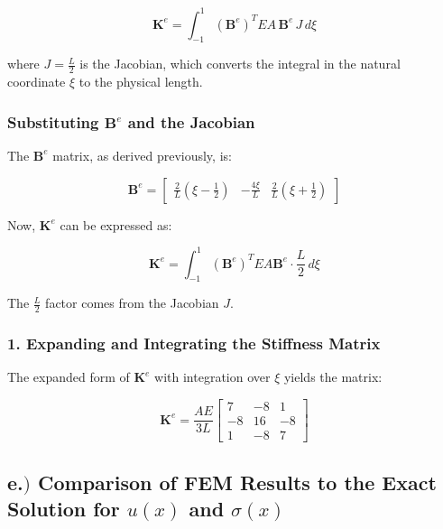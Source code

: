 \begin{equation}
    \mathbf{K}^e = \int_{-1}^{1} (\mathbf{B}^e)^T E A \, \mathbf{B}^e \, J \, d\xi
\end{equation}

where \( J = \frac{L}{2} \) is the Jacobian, which converts the integral in the natural coordinate \( \xi \) to the physical length.

\subsubsection*{Substituting \( \mathbf{B}^e \) and the Jacobian}

The \( \mathbf{B}^e \) matrix, as derived previously, is:

\begin{equation}
    \mathbf{B}^e = \begin{bmatrix} \frac{2}{L} \left( \xi - \frac{1}{2} \right) & -\frac{4\xi}{L} & \frac{2}{L} \left( \xi + \frac{1}{2} \right) \end{bmatrix}
\end{equation}

Now, \( \mathbf{K}^e \) can be expressed as:

\begin{equation}
    \mathbf{K}^e = \int_{-1}^{1} (\mathbf{B}^e)^T E A \mathbf{B}^e \cdot \frac{L}{2} \, d\xi
\end{equation}

The \( \frac{L}{2} \) factor comes from the Jacobian \( J \).

\subsubsection*{1. Expanding and Integrating the Stiffness Matrix}

The expanded form of \( \mathbf{K}^e \) with integration over \( \xi \) yields the matrix:

\begin{equation}
    \mathbf{K}^e = \frac{A E}{3 L} \begin{bmatrix} 7 & -8 & 1 \\ -8 & 16 & -8 \\ 1 & -8 & 7 \end{bmatrix}
\end{equation}

\subsection*{e.$)$ Comparison of FEM Results to the Exact Solution for \( u(x) \) and \( \sigma(x) \)}

